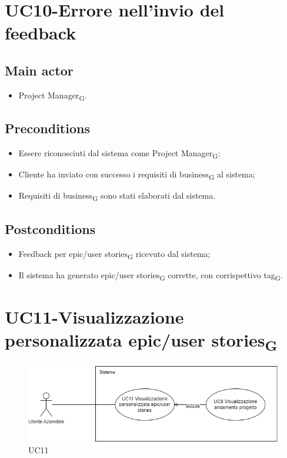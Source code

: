 \documentclass{article}
\begin{document}
\section{UC10-Errore nell'invio del feedback}

     \subsection*{Main actor}
     \begin{itemize}
         \item Project Manager\textsubscript{G}.
     \end{itemize}
   \subsection*{Preconditions}
        \begin{itemize}
            \item Essere riconosciuti dal sistema come Project Manager\textsubscript{G};
            \item Cliente ha inviato con successo i requisiti di business\textsubscript{G} al sistema;
            \item Requisiti di business\textsubscript{G} sono stati elaborati dal sistema.
        \end{itemize}
        
    \subsection*{Postconditions}
        \begin{itemize}
            \item Feedback per epic/user stories\textsubscript{G} ricevuto dal sistema;
            \item Il sistema ha generato epic/user stories\textsubscript{G} corrette, con corrispettivo tag\textsubscript{G}.
        \end{itemize} 

  
\section{UC11-Visualizzazione personalizzata epic/user stories\textsubscript{G}}
    \begin{figure}[h]
      \centering
      \includegraphics[width=.8\textwidth, height=.6\textheight, keepaspectratio]{./imgUML/UC11.png}
        \caption{UC11}
      \label{fig:UC11}
    \end{figure}
    
\end{document}
